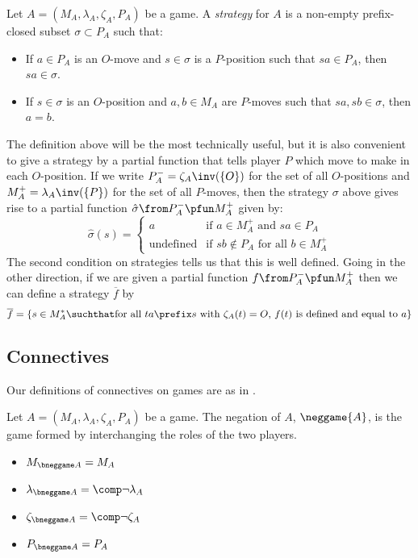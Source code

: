 \documentclass[11pt]{article} %
\begin{document}
\begin{definition}
  Let $A=(M_A,\lambda_A,\zeta_A,P_A)$ be a game.  A \emph{strategy} for $A$ is a non-empty prefix-closed subset $\sigma\subset P_A$ such that:
  \begin{itemize}
    \item If $a\in P_A$ is an $O$-move and $s\in\sigma$ is a $P$-position such that $sa\in P_A$, then $sa\in\sigma$.
    \item If $s\in\sigma$ is an $O$-position and $a,b\in M_A$ are $P$-moves such that $sa,sb\in\sigma$, then $a=b$.
  \end{itemize}
\end{definition}

The definition above will be the most technically useful, but it is also convenient to give a strategy by a partial function that tells player $P$ which move to make in each $O$-position.  If we write $P_A^-=\zeta_A\inv(\{O\})$ for the set of all $O$-positions and $M_A^+=\lambda_A\inv(\{P\})$ for the set of all $P$-moves, then the strategy $\sigma$ above gives rise to a partial function $\hat\sigma\from P_A^-\pfun M_A^+$ given by:
\[
  \hat\sigma(s)=
  \begin{cases}
    a & \textrm{if $a\in M_A^+$ and $sa\in P_A$}\\
    \textrm{undefined} & \textrm{if $sb\not\in P_A$ for all $b\in M_A^+$}
  \end{cases}
  \]
The second condition on strategies tells us that this is well defined.  Going in the other direction, if we are given a partial function $f\from P_A^-\pfun M_A^+$  then we can define a strategy $\overline{f}$ by
\[
  \overline f = \{s\in M_A^*\suchthat \textrm{for all $ta\prefix s$ with $\zeta_A(t)=O$, $f(t)$ is defined and equal to $a$}\}
  \]

\subsection{Connectives}

Our definitions of connectives on games are as in \cite{blassgames}.

\begin{definition}
  Let $A=(M_A,\lambda_A,\zeta_A,P_A)$ be a game.  The negation of $A$, $\neggame{A}$, is the game formed by interchanging the roles of the two players.
  \begin{itemize}
    \item $M_{\bneggame A}=M_A$
    \item $\lambda_{\bneggame A} = \comp\neg{\lambda_A}$
    \item $\zeta_{\bneggame A} = \comp\neg{\zeta_A}$
    \item $P_{\bneggame A} = P_A$
  \end{itemize}
\end{definition}
\end{document}
